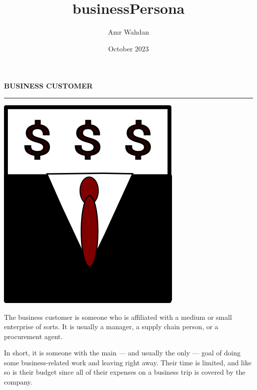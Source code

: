 \documentclass[12pt]{article}
\title{businessPersona}
\author{Amr Wahdan}
\date{October 2023}
\begin{document}
{\Huge\bfseries BUSINESS CUSTOMER} \\
\hrule
\vspace{3em}
\begin{minipage}{0.45\textwidth}
    \includegraphics[scale=0.7]{suit.png}
\end{minipage}
\begin{minipage}{0.5\textwidth}
    \begin{flushleft}
    \large
    The business customer is someone who is affiliated with a medium or small enterprise of sorts. It is usually a manager, a supply chain person, or a procurement agent. \par 
    \vspace{1em}
    In short, it is someone with the main --- and usually the only --- goal of doing some business-related work and leaving right away. Their time is limited, and like so is their budget since all of their expenses on a business trip is covered by the company.
    \end{flushleft}
\end{minipage}

\vspace{6em}
\end{document}
